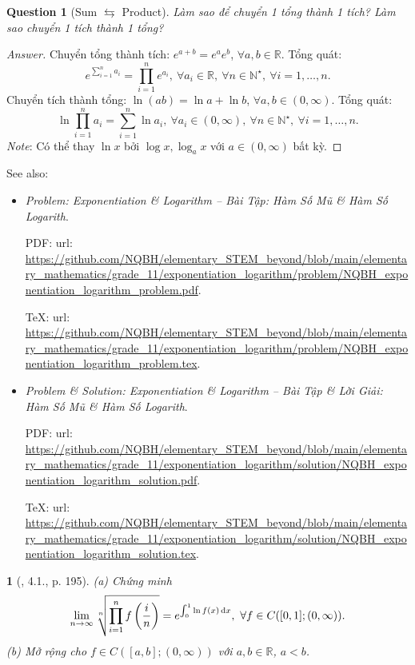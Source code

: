 \documentclass{article}
\newtheorem{baitoan}{}
\newtheorem{question}{Question}
\begin{document}
\begin{question}[Sum $\leftrightarrows$ Product]
	Làm sao để chuyển 1 tổng thành 1 tích? Làm sao chuyển 1 tích thành 1 tổng?
\end{question}

\begin{proof}[Answer]
	Chuyển tổng thành tích: $e^{a + b} = e^ae^b$, $\forall a,b\in\mathbb{R}$. Tổng quát:
	\begin{equation*}
		e^{\sum_{i=1}^n a_i} = \prod_{i=1}^n e^{a_i},\ \forall a_i\in\mathbb{R},\ \forall n\in\mathbb{N}^\star,\ \forall i = 1,\ldots,n.
	\end{equation*}
	Chuyển tích thành tổng: $\ln(ab) = \ln a + \ln b$, $\forall a,b\in(0,\infty)$. Tổng quát:
	\begin{equation*}
		\ln\prod_{i=1}^n a_i = \sum_{i=1}^n \ln a_i,\ \forall a_i\in(0,\infty),\ \forall n\in\mathbb{N}^\star,\ \forall i = 1,\ldots,n.
	\end{equation*}
	{\it Note}: Có thể thay $\ln x$ bởi $\log x,\log_a x$ với $a\in(0,\infty)$ bất kỳ.
\end{proof}
See also:
\begin{itemize}
	\item {\it Problem: Exponentiation \& Logarithm -- Bài Tập: Hàm Số Mũ \& Hàm Số Logarith}.
	
	PDF: {\sc url}: \url{https://github.com/NQBH/elementary_STEM_beyond/blob/main/elementary_mathematics/grade_11/exponentiation_logarithm/problem/NQBH_exponentiation_logarithm_problem.pdf}.
	
	\TeX: {\sc url}: \url{https://github.com/NQBH/elementary_STEM_beyond/blob/main/elementary_mathematics/grade_11/exponentiation_logarithm/problem/NQBH_exponentiation_logarithm_problem.tex}.
	\item {\it Problem \& Solution: Exponentiation \& Logarithm -- Bài Tập \& Lời Giải: Hàm Số Mũ \& Hàm Số Logarith}.
	
	PDF: {\sc url}: \url{https://github.com/NQBH/elementary_STEM_beyond/blob/main/elementary_mathematics/grade_11/exponentiation_logarithm/solution/NQBH_exponentiation_logarithm_solution.pdf}.
	
	\TeX: {\sc url}: \url{https://github.com/NQBH/elementary_STEM_beyond/blob/main/elementary_mathematics/grade_11/exponentiation_logarithm/solution/NQBH_exponentiation_logarithm_solution.tex}.
\end{itemize}

\begin{baitoan}[\cite{Quoc_Long_Dat_Nam_VMC}, 4.1., p. 195]
	(a) Chứng minh
	\begin{equation*}
		\lim_{n\to\infty} \sqrt[n]{\prod_{i=1}^n f\left(\frac{i}{n}\right)} = e^{\int_0^1 \ln f(x)\,{\rm d}x},\ \forall f\in C([0,1];(0,\infty)).
	\end{equation*}
	(b) Mở rộng cho $f\in C([a,b];(0,\infty))$ với $a,b\in\mathbb{R}$, $a < b$.
\end{baitoan}
\end{document}
